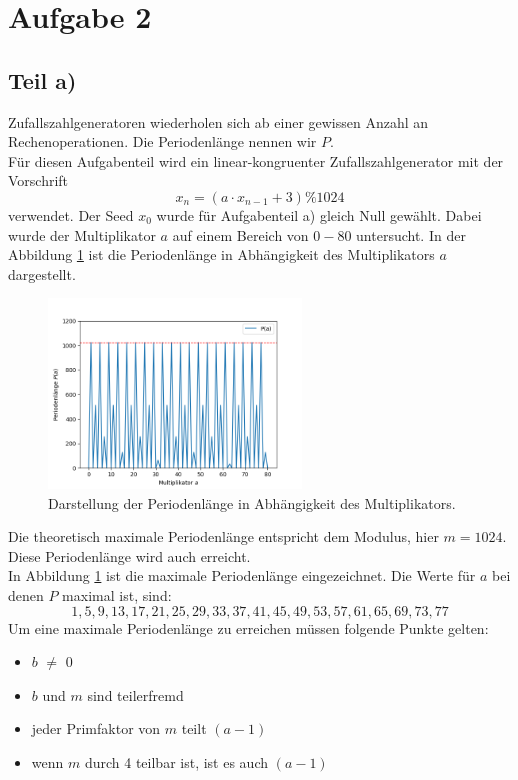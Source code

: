 \section{Aufgabe 2}
\label{sec:Aufgabe2}
%
\subsection{Teil a)}
Zufallszahlgeneratoren wiederholen sich ab einer gewissen Anzahl an Rechenoperationen.
Die Periodenlänge nennen wir $P$.\\
Für diesen Aufgabenteil wird ein linear-kongruenter Zufallszahlgenerator mit der
Vorschrift
\begin{equation*}
  x_n=(a\cdot x_{n-1}+3)\%1024
\end{equation*}
verwendet. Der Seed $x_0$ wurde für Aufgabenteil a) gleich Null gewählt.
Dabei wurde der Multiplikator $a$ auf einem Bereich von $0-80$ untersucht.
In der Abbildung \ref{fig:Periodenlaenge} ist die Periodenlänge in Abhängigkeit
des Multiplikators $a$ dargestellt.
\begin{figure}[H]
  \centering
  \includegraphics[width=0.6\textwidth]{plots/Periodenlaenge.png}
  \caption{Darstellung der Periodenlänge in Abhängigkeit des Multiplikators.}
  \label{fig:Periodenlaenge}
\end{figure}
Die theoretisch maximale Periodenlänge entspricht dem Modulus, hier $m=1024$.
Diese Periodenlänge wird auch erreicht.\\
In Abbildung \ref{fig:Periodenlaenge} ist die maximale Periodenlänge
eingezeichnet. Die Werte für $a$ bei denen $P$ maximal ist, sind:
\begin{equation*}
  1,5,9,13,17,21,25,29,33,37,41,45,49,53,57,61,65,69,73,77
\end{equation*}
Um eine maximale Periodenlänge zu erreichen müssen folgende Punkte gelten:
\begin{itemize}
  \item $b$ $\neq$ 0
  \item $b$ und $m$ sind teilerfremd
  \item jeder Primfaktor von $m$ teilt $(a-1)$
  \item wenn $m$ durch 4 teilbar ist, ist es auch $(a-1)$
\end{itemize}

